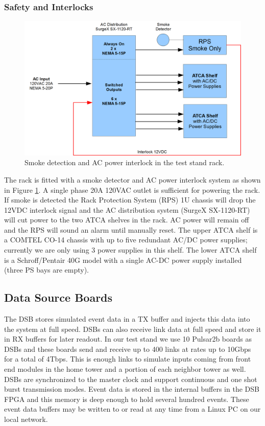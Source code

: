 \documentclass[letterpaper]{article}
\begin{document}
\subsubsection{Safety and Interlocks}

\begin{figure}
\centering
\includegraphics[width=12cm]{interlock.png}
\caption{Smoke detection and AC power interlock in the test stand rack.}
\label{interlock}
\end{figure}

The rack is fitted with a smoke detector and AC power interlock system as shown in Figure \ref{interlock}.  A single phase 20A 120VAC outlet is sufficient for powering the rack.  If smoke is detected the Rack Protection System (RPS) 1U chassis \cite{rps} will drop the 12VDC interlock signal and the AC distribution system (SurgeX SX-1120-RT) will cut power to the two ATCA shelves in the rack.  AC power will remain off and the RPS  will sound an alarm until manually reset.  The upper ATCA shelf is a COMTEL CO-14 chassis with up to five redundant AC/DC power supplies; currently we are only using 3 power supplies in this shelf.  The lower ATCA shelf is a Schroff/Pentair 40G model with a single AC-DC power supply installed (three PS bays are empty).

\subsection{Data Source Boards}


The DSB stores simulated event data in a TX buffer and injects this data into the system at full speed.  DSBs can also receive link data at full speed and store it in RX buffers for later readout.  In our test stand we use 10 Pulsar2b boards as DSBs and these boards send and receive up to 400 links at rates up to 10Gbps for a total of 4Tbps.  This is enough links to simulate inputs coming from front end modules in the home tower and a portion of each neighbor tower as well.  DSBs are synchronized to the master clock and support continuous and one shot burst transmission modes.  Event data is stored in the internal buffers in the DSB FPGA and this memory is deep enough to hold several hundred events.  These event data buffers may be written to or read at any time from a Linux PC on our local network.  
\end{document}
